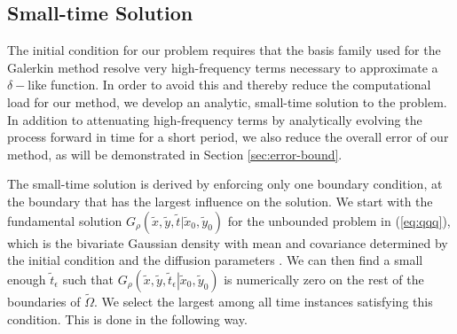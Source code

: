 \subsection{Small-time Solution} \label{sec:pde-small-t}

The initial condition for our problem requires that the basis family
used for the Galerkin method resolve very high-frequency terms
necessary to approximate a $\delta-$like function. In order to avoid this
and thereby reduce the computational load for our method, we develop
an analytic, small-time solution to the problem. In addition to
attenuating high-frequency terms by analytically evolving the process
forward in time for a short period, we also reduce the overall error
of our method, as will be demonstrated in Section
\ref{sec:error-bound}.

The small-time solution is derived by enforcing only one boundary
condition, at the boundary that has the largest influence on the
solution. We start with the fundamental solution
$G_\rho(\tilde{x},\tilde{y},\tilde{t} | \tilde{x}_0, \tilde{y}_0)$ for
the unbounded problem in (\ref{eq:qqq}), which is the bivariate
Gaussian density with mean and covariance determined by the initial
condition and the diffusion parameters \cite{stakgold2011green}. We
can then find a small enough $\tilde{t}_\epsilon$ such that
$G_\rho\left(\tilde{x},\tilde{y}, \tilde{t}_\epsilon \left|
    \tilde{x}_0, \tilde{y}_0 \right.\right)$ is numerically zero on
the rest of the boundaries of $\tilde{\Omega}$. We select the largest
among all time instances satisfying this condition. This is done in
the following way.
